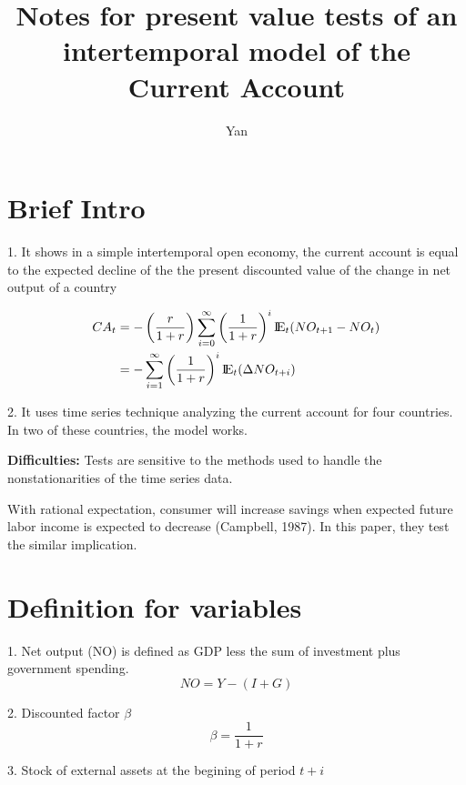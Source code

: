 \documentclass[12pt]{article}
\title{Notes for present value tests of an intertemporal model of the Current Account}
\author{Yan}
\date{}
\begin{document}
\maketitle
\newpage



\section{Brief Intro}

1. It shows in a simple intertemporal open economy, the current account is equal to the
expected decline of the the present discounted value of the change in net output of 
a country

\begin{align*}
CA_{t} &=  - \left( \frac{r}{1 + r}\right) 
\sum\limits_{i = 0} ^\infty \left( \frac{1}{1 + r} \right) ^{i}
{\rm I\!{E}}_{t}(NO_{t + 1} - NO_{t})\\
 &=  - \sum\limits_{i = 1} ^\infty \left( \frac{1}{1 + r} \right) 	^{i}
 {\rm I\!{E}}_{t}(\Delta NO_{t + i})
\end{align*}


2. It uses time series technique analyzing the current account for four countries. 
In two of these countries, the model works.


{\textbf {Difficulties:}} Tests are sensitive to the methods used to handle the
nonstationarities of the time series data.


With rational expectation, consumer will increase savings when expected future labor
income is expected to decrease (Campbell, 1987). In this paper, they test the similar
implication.






\section{Definition for variables}

1. Net output (NO) is defined as GDP less the sum of investment plus government spending.
\begin{equation*}
NO = Y - (I + G)
\end{equation*}

2. Discounted factor $ \beta $
\begin{equation*}
\beta = \frac{1}{1 + r}
\end{equation*}

3. Stock of external assets at the begining of period $ t + i $
\end{document}
